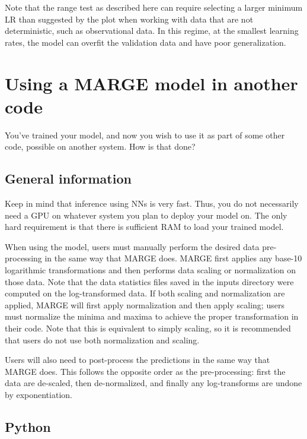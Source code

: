 \documentclass[letterpaper, 12pt]{article}
\begin{document}
\noindent Note that the range test as described here can require selecting a 
larger minimum LR than suggested by the plot when working with data that 
are not deterministic, such as observational data.  In this regime, at the 
smallest learning rates, the model can overfit the validation data and have 
poor generalization.


\section{Using a MARGE model in another code}

You've trained your model, and now you wish to use it as part of some other 
code, possible on another system.  How is that done?

\subsection{General information}
\label{sec:generalusemodel}

Keep in mind that inference using NNs is very fast. Thus, you do not necessarily 
need a GPU on whatever system you plan to deploy your model on.  The only 
hard requirement is that there is sufficient RAM to load your trained model. \newline

\noindent When using the model, users must manually perform the desired data 
pre-processing in the same way that MARGE does.  MARGE first applies any base-10 
logarithmic transformations and then performs data scaling or normalization 
on those data.  Note that the data statistics files saved in the inputs directory 
were computed on the log-transformed data.  If both scaling and normalization 
are applied, MARGE will first apply normalization and then apply scaling; users 
must normalize the minima and maxima to achieve the proper transformation 
in their code.  Note that this is equivalent to simply scaling, so it is 
recommended that users do not use both normalization and scaling.  \newline

\noindent Users will also need to post-process the predictions in the same way 
that MARGE does.  This follows the opposite order as the pre-processing: first 
the data are de-scaled, then de-normalized, and finally any log-transforms are 
undone by exponentiation.

\subsection{Python}
\end{document}
